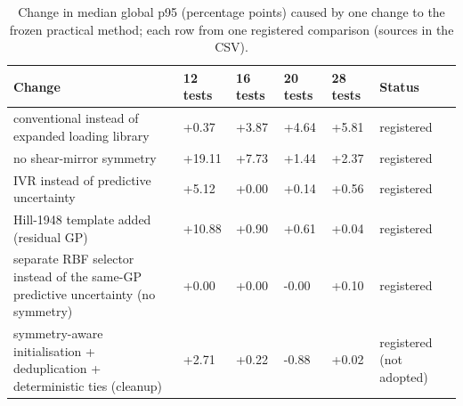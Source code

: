 \begin{table}[t]
\centering
\scriptsize
\caption{Change in median global p95 (percentage points) caused by one change to the frozen practical method; each row from one registered comparison (sources in the CSV).}
\label{tab:method_ablation}
\begin{tabular}{llllll}
\hline
Change & 12 tests & 16 tests & 20 tests & 28 tests & Status \\
\hline
conventional instead of expanded loading library & +0.37 & +3.87 & +4.64 & +5.81 & registered \\
no shear-mirror symmetry & +19.11 & +7.73 & +1.44 & +2.37 & registered \\
IVR instead of predictive uncertainty & +5.12 & +0.00 & +0.14 & +0.56 & registered \\
Hill-1948 template added (residual GP) & +10.88 & +0.90 & +0.61 & +0.04 & registered \\
separate RBF selector instead of the same-GP predictive uncertainty (no symmetry) & +0.00 & +0.00 & -0.00 & +0.10 & registered \\
symmetry-aware initialisation + deduplication + deterministic ties (cleanup) & +2.71 & +0.22 & -0.88 & +0.02 & registered (not adopted) \\
\hline
\end{tabular}
\end{table}
